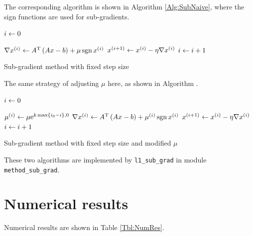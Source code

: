 \documentclass[english]{pkupaper}
\begin{document}
\begin{thmquestion}[3 (b)]
The corresponding algorithm is shown in Algorithm \ref{Alg:SubNaive}, where the sign functions are used for sub-gradients.

\begin{algorithm}
\SetAlgoLined


$ i \leftarrow 0 $\;

{
	$ \nabla x^{\left( i \right)} \leftarrow A^{\mathrm{T}} \left(  A x - b  \right) + \mu \operatorname{\mathrm{sgn}} x^{\left( i \right)} $\;
	$ x^{\left(  i + 1  \right)} \leftarrow x^{\left( i \right)} - \eta \nabla x^{\left( i \right)} $\;
	$ i \leftarrow i + 1 $\;
}

\caption{Sub-gradient method with fixed step size} \label{Alg:SubNaive}
\end{algorithm}

The same strategy of adjusting $\mu$ here, as shown in Algorithm \label{Alg:SubExpReg}.

\begin{algorithm}
\SetAlgoLined


$ i \leftarrow 0 $\;

{
	$ \mu^{\left( i \right)} \leftarrow \mu \mathrm{e}^{ k \max \left\{  i_0 - i  \right\}, 0 } $\;
	$ \nabla x^{\left( i \right)} \leftarrow A^{\mathrm{T}} \left(  A x - b  \right) + \mu^{\left( i \right)} \operatorname{\mathrm{sgn}} x^{\left( i \right)} $\;
	$ x^{\left(  i + 1  \right)} \leftarrow x^{\left( i \right)} - \eta \nabla x^{\left( i \right)} $\;
	$ i \leftarrow i + 1 $\;
}

\caption{Sub-gradient method with fixed step size and modified $\mu$} \label{Alg:SubExpReg}
\end{algorithm}

These two algorithms are implemented by \verb"l1_sub_grad" in module \verb"method_sub_grad".
\end{thmquestion}

\section{Numerical results}

Numerical results are shown in Table \ref{Tbl:NumRes}.
\end{document}
